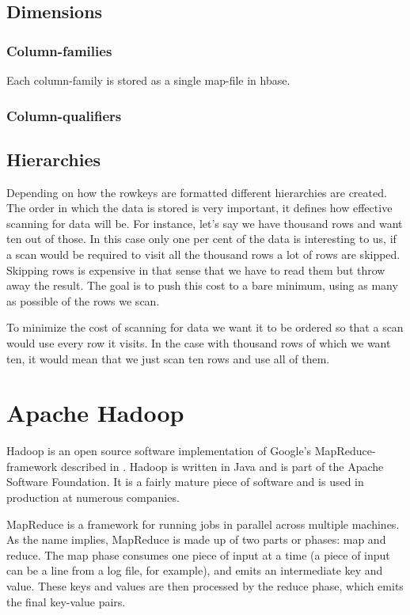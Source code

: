 \documentclass[a4paper,10pt]{book}
\begin{document}
\subsection{Dimensions}

\subsubsection{Column-families}

Each column-family is stored as a single map-file in hbase.


\subsubsection{Column-qualifiers}



\subsection{Hierarchies}

Depending on how the rowkeys are formatted different hierarchies are
created. The order in which the data is stored is very important, it
defines how effective scanning for data will be. For instance, let's say we
have thousand rows and want ten out of those. In this case only one per
cent of the data is interesting to us, if a scan would be required to visit
all the thousand rows a lot of rows are skipped. Skipping rows is expensive
in that sense that we have to read them but throw away the result. The goal
is to push this cost to a bare minimum, using as many as possible of the
rows we scan.

To minimize the cost of scanning for data we want it to be ordered so that
a scan would use every row it visits. In the case with thousand rows of
which we want ten, it would mean that we just scan ten rows and use all of
them.


\section{Apache Hadoop}

Hadoop is an open source software implementation of Google's MapReduce-framework described in \cite{mapreduce}. Hadoop is written in Java and is part of the Apache Software Foundation.  It is a fairly mature piece of software and is used in production at numerous companies.

MapReduce is a framework for running jobs in parallel across multiple machines.  As the name implies, MapReduce is made up of two parts or phases: map and reduce. The map phase consumes one piece of input at a time (a piece of input can be a line from a log file, for example), and emits an intermediate key and value. These keys and values are then processed by the reduce phase, which emits the final key-value pairs.
\end{document}

